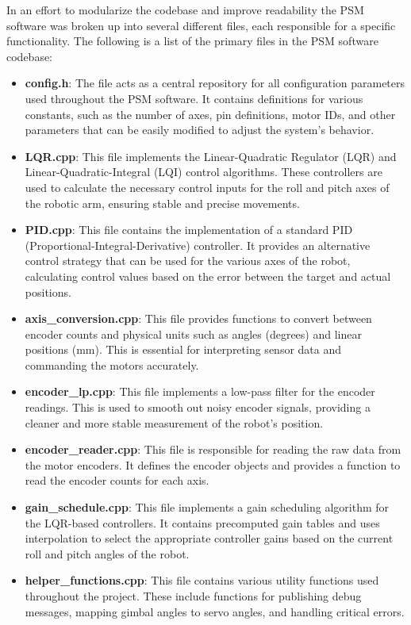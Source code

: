 In an effort to modularize the codebase and improve readability the PSM software was broken up into several different files, each responsible for a specific functionality. The following is a list of the primary files in the PSM software codebase:

\begin{itemize}
    \item \textbf{config.h}: The file acts as a central repository for all configuration parameters used throughout the PSM software. It contains definitions for various constants, such as the number of axes, pin definitions, motor IDs, and other parameters that can be easily modified to adjust the system's behavior.
    \item \textbf{LQR.cpp}: This file implements the Linear-Quadratic Regulator (LQR) and Linear-Quadratic-Integral (LQI) control algorithms. These controllers are used to calculate the necessary control inputs for the roll and pitch axes of the robotic arm, ensuring stable and precise movements.
    \item \textbf{PID.cpp}: This file contains the implementation of a standard PID (Proportional-Integral-Derivative) controller. It provides an alternative control strategy that can be used for the various axes of the robot, calculating control values based on the error between the target and actual positions.
    \item \textbf{axis\_conversion.cpp}: This file provides functions to convert between encoder counts and physical units such as angles (degrees) and linear positions (mm). This is essential for interpreting sensor data and commanding the motors accurately.
    \item \textbf{encoder\_lp.cpp}: This file implements a low-pass filter for the encoder readings. This is used to smooth out noisy encoder signals, providing a cleaner and more stable measurement of the robot's position.
    \item \textbf{encoder\_reader.cpp}: This file is responsible for reading the raw data from the motor encoders. It defines the encoder objects and provides a function to read the encoder counts for each axis.
    \item \textbf{gain\_schedule.cpp}: This file implements a gain scheduling algorithm for the LQR-based controllers. It contains precomputed gain tables and uses interpolation to select the appropriate controller gains based on the current roll and pitch angles of the robot.
    \item \textbf{helper\_functions.cpp}: This file contains various utility functions used throughout the project. These include functions for publishing debug messages, mapping gimbal angles to servo angles, and handling critical errors.

\end{itemize}

